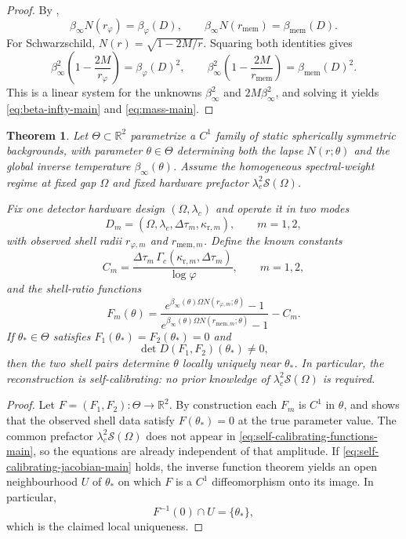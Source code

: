 \documentclass[11pt]{amsart}
\numberwithin{equation}{section}
\newtheorem{theorem}{Theorem}[section]
\theoremstyle{remark}
\newcommand{\RR}{\mathbb{R}}
\begin{document}
\begin{proof}
By ,
\[
\beta_\infty N(r_{\varphi})=\beta_{\varphi}(D),
\qquad
\beta_\infty N(r_{\mathrm{mem}})=\beta_{\mathrm{mem}}(D).
\]
For Schwarzschild, $N(r)=\sqrt{1-2M/r}$. Squaring both identities gives
\[
\beta_\infty^2\left(1-\frac{2M}{r_{\varphi}}\right)=\beta_{\varphi}(D)^2,
\qquad
\beta_\infty^2\left(1-\frac{2M}{r_{\mathrm{mem}}}\right)=\beta_{\mathrm{mem}}(D)^2.
\]
This is a linear system for the unknowns $\beta_\infty^2$ and $2M\beta_\infty^2$, and solving it yields \eqref{eq:beta-infty-main} and \eqref{eq:mass-main}.
\end{proof}

\begin{theorem}\label{thm:two-mode-main}
Let $\Theta\subset\RR^2$ parametrize a $C^1$ family of static spherically symmetric backgrounds, with parameter $\theta\in\Theta$ determining both the lapse $N(r;\theta)$ and the global inverse temperature $\beta_\infty(\theta)$. Assume the homogeneous spectral-weight regime at fixed gap $\Omega$ and fixed hardware prefactor $\lambda_c^2\mathcal S(\Omega)$.

Fix one detector hardware design $(\Omega,\lambda_c)$ and operate it in two modes
\[
D_m=(\Omega,\lambda_c,\Delta\tau_m,\kappa_{{\mathrm r},m}),
\qquad m=1,2,
\]
with observed shell radii $r_{\varphi,m}$ and $r_{{\mathrm{mem}},m}$. Define the known constants
\begin{equation}\label{eq:self-calibrating-constants-main}
C_m=\frac{\Delta\tau_m\,\Gamma_c(\kappa_{{\mathrm r},m},\Delta\tau_m)}{\log\varphi},
\qquad m=1,2,
\end{equation}
and the shell-ratio functions
\begin{equation}\label{eq:self-calibrating-functions-main}
F_m(\theta)=
\frac{e^{\beta_\infty(\theta)\Omega N(r_{\varphi,m};\theta)}-1}
     {e^{\beta_\infty(\theta)\Omega N(r_{{\mathrm{mem}},m};\theta)}-1}
-C_m.
\end{equation}
If $\theta_*\in\Theta$ satisfies $F_1(\theta_*)=F_2(\theta_*)=0$ and
\begin{equation}\label{eq:self-calibrating-jacobian-main}
\det D(F_1,F_2)(\theta_*)\neq0,
\end{equation}
then the two shell pairs determine $\theta$ locally uniquely near $\theta_*$. In particular, the reconstruction is self-calibrating: no prior knowledge of $\lambda_c^2\mathcal S(\Omega)$ is required.
\end{theorem}

\begin{proof}
Let $F=(F_1,F_2):\Theta\to\RR^2$. By construction each $F_m$ is $C^1$ in $\theta$, and  shows that the observed shell data satisfy $F(\theta_*)=0$ at the true parameter value. The common prefactor $\lambda_c^2\mathcal S(\Omega)$ does not appear in \eqref{eq:self-calibrating-functions-main}, so the equations are already independent of that amplitude. If \eqref{eq:self-calibrating-jacobian-main} holds, the inverse function theorem \cite{KrantzParks2002} yields an open neighbourhood $U$ of $\theta_*$ on which $F$ is a $C^1$ diffeomorphism onto its image. In particular,
\[
F^{-1}(0)\cap U=\{\theta_*\},
\]
which is the claimed local uniqueness.
\end{proof}
\end{document}

